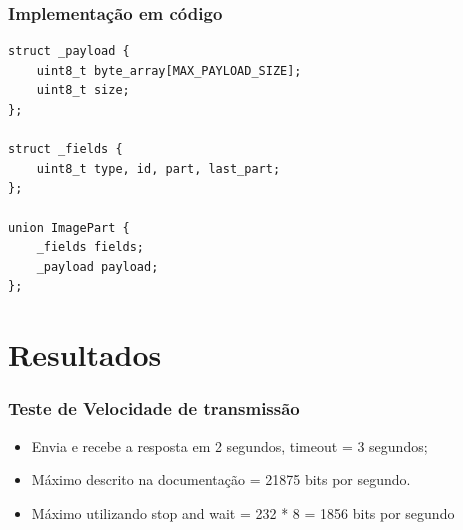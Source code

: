 \documentclass[12pt]{beamer}
\begin{document}
\begin{frame}[t,fragile]
    \frametitle{Implementação em código}
    \centering
    \begin{lstlisting}[basicstyle=\small]
struct _payload {
    uint8_t byte_array[MAX_PAYLOAD_SIZE];
    uint8_t size;
};

struct _fields {
    uint8_t type, id, part, last_part;
};

union ImagePart {
    _fields fields;
    _payload payload;
};
    \end{lstlisting}
\end{frame}



\section{Resultados}
\begin{frame}
    \frametitle{Teste de Velocidade de transmissão}
    \begin{itemize}
        \item Envia e recebe a resposta em 2 segundos, timeout = 3 segundos;
        \item Máximo descrito na documentação = 21875 bits por segundo.
        \item Máximo utilizando stop and wait = 232 * 8 = 1856 bits por segundo
    \end{itemize}
\end{frame}
\end{document}
